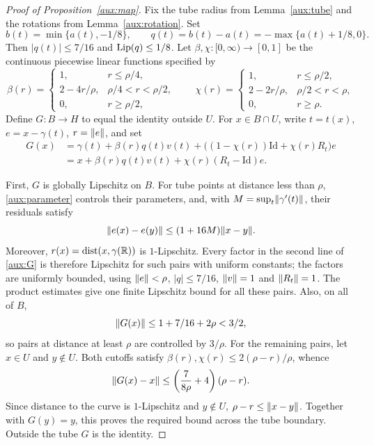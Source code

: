 \begin{proof}[Proof of Proposition~\ref{aux:map}]
Fix the tube radius from Lemma~\ref{aux:tube} and the rotations from
Lemma~\ref{aux:rotation}. Set
\[
 b(t)=\min\{a(t),-1/8\},\qquad
 q(t)=b(t)-a(t)=-\max\{a(t)+1/8,0\}.
\]
Then $|q(t)|\le7/16$ and $\operatorname{Lip}(q)\le1/8$. Let
$\beta,\chi:[0,\infty)\to[0,1]$ be the continuous piecewise linear
functions specified by
\[
 \beta(r)=
 \begin{cases}
 1,&r\le\rho/4,\\
 2-4r/\rho,&\rho/4<r<\rho/2,\\
 0,&r\ge\rho/2,
 \end{cases}
 \qquad
 \chi(r)=
 \begin{cases}
 1,&r\le\rho/2,\\
 2-2r/\rho,&\rho/2<r<\rho,\\
 0,&r\ge\rho.
 \end{cases}
\]
Define $G:B\to H$ to equal the identity outside $U$. For $x\in B\cap U$,
write $t=t(x)$, $e=x-\gamma(t)$, $r=\lVert e\rVert$, and set
\begin{equation}\label{aux:G}
 \begin{split}
 G(x)&=\gamma(t)+\beta(r)q(t)v(t)
       +\bigl((1-\chi(r))\mathrm{Id}+\chi(r)R_t\bigr)e\\
 &=x+\beta(r)q(t)v(t)+\chi(r)(R_t-\mathrm{Id})e.
 \end{split}
\end{equation}

First, $G$ is globally Lipschitz on $B$. For tube points at distance
less than $\rho$, \eqref{aux:parameter} controls their parameters,
and, with $M=\sup_t\lVert \gamma'(t)\rVert$, their residuals satisfy
\[
 \lVert e(x)-e(y)\rVert\le(1+16M)\lVert x-y\rVert.
\]
Moreover, $r(x)=\operatorname{dist}(x,\gamma(\mathbb R))$ is
$1$-Lipschitz. Every factor in the second line of \eqref{aux:G} is
therefore Lipschitz for such pairs with uniform constants; the factors
are uniformly bounded, using $\lVert e\rVert<\rho$, $|q|\le7/16$,
$\lVert v\rVert=1$ and $\lVert R_t\rVert=1$. The product estimates give one
finite Lipschitz bound for all these pairs. Also, on all of $B$,
\[
 \lVert G(x)\rVert\le1+7/16+2\rho<3/2,
\]
so pairs at distance at least $\rho$ are controlled by $3/\rho$.
For the remaining pairs, let $x\in U$ and $y\notin U$. Both cutoffs
satisfy $\beta(r),\chi(r)\le2(\rho-r)/\rho$, whence
\[
 \lVert G(x)-x\rVert
 \le\left(\frac{7}{8\rho}+4\right)(\rho-r).
\]
Since distance to the curve is $1$-Lipschitz and $y\notin U$,
$\rho-r\le\lVert x-y\rVert$. Together with $G(y)=y$, this proves the
required bound across the tube boundary. Outside the tube $G$ is the
identity.


\end{proof}
